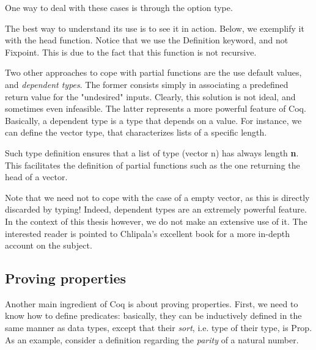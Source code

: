 		One way to deal with these cases is through the \textsf{option} type.
		
		
			
	\noindent The best way to understand its use is to see it in action. Below, we exemplify
	it with the \textsf{head} function. Notice that we use the \textsf{Definition} keyword, and
	not \textsf{Fixpoint}. This is due to the fact that this function is not recursive.

	

	\noindent Two other approaches to cope with partial functions are the use default values, and
	\textit{dependent types}. The former consists simply in associating a predefined return value for 
	the "undesired" inputs. Clearly, this solution is not ideal, and sometimes even infeasible.	 
	The latter represents a more powerful feature of Coq. Basically, a dependent type is 
	a type that depends on a value. For instance, we can define the \textsf{vector} type, 
	that characterizes lists of a specific length.
	
	
	
	\noindent Such type definition ensures that a list of type \textsf{(vector n)} has
	always length \textbf{n}. This facilitates the definition of partial functions such as the
	one returning the head of a vector.
	
	

	\noindent Note that we need not to cope with the case of a empty vector, as this is directly
	discarded by typing! Indeed, dependent types are an extremely powerful feature. In the context
	of this thesis however, we do not make an extensive use of it. The interested reader is pointed
	to Chlipala's excellent book \cite{chlipalacpdt2011} for a more in-depth account on the subject.

	 

\subsection{Proving properties}
\label{sub:provecoq}	
	
			
	Another main ingredient of Coq is about proving properties. First, we need
	to know how to define predicates: basically, they can be inductively 
	defined in the same manner as  data types, except that their \textit{sort},
	i.e. type of their type, is \textsf{Prop}. 
	As an example, consider a definition regarding the 
	\textit{parity} of a natural number.
	
